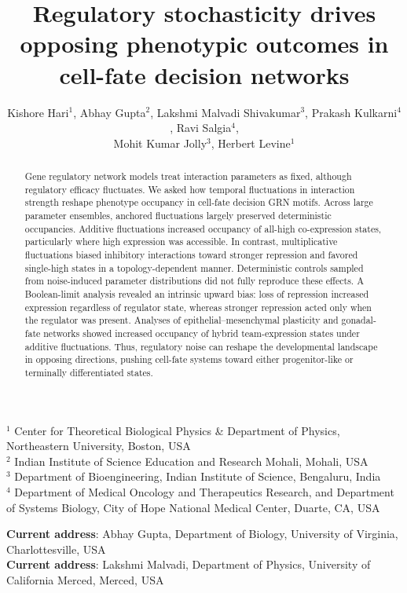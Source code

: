 \documentclass[11pt]{article}
\title{Regulatory stochasticity drives opposing phenotypic outcomes in cell-fate decision networks}
\author{Kishore Hari$^1$, Abhay Gupta$^2$, Lakshmi Malvadi Shivakumar$^3$, Prakash Kulkarni$^4$, Ravi Salgia$^4$, \\ Mohit Kumar Jolly$^3$, Herbert Levine$^1$}
\begin{document}
\maketitle
\begin{center}
    $^1$ Center for Theoretical Biological Physics \& Department of Physics, Northeastern University, Boston, USA\\
    $^2$ Indian Institute of Science Education and Research Mohali, Mohali, USA\\
    $^3$ Department of Bioengineering, Indian Institute of Science, Bengaluru, India \\
    $^4$ Department of Medical Oncology and Therapeutics Research, and Department of Systems Biology, City of Hope National Medical Center, Duarte, CA, USA \\
\end{center}

\begin{center}
    \textbf{Current address}: Abhay Gupta, Department of Biology, University of Virginia, Charlottesville, USA\\
\textbf{Current address}: Lakshmi Malvadi, Department of Physics, University of California Merced, Merced, USA
\end{center}
\begin{abstract}
Gene regulatory network models treat interaction parameters as fixed, although regulatory efficacy fluctuates. We asked how temporal fluctuations in interaction strength reshape phenotype occupancy in cell-fate decision GRN motifs. Across large parameter ensembles, anchored fluctuations largely preserved deterministic occupancies. Additive fluctuations increased occupancy of all-high co-expression states, particularly where high expression was accessible. In contrast, multiplicative fluctuations biased inhibitory interactions toward stronger repression and favored single-high states in a topology-dependent manner. Deterministic controls sampled from noise-induced parameter distributions did not fully reproduce these effects. A Boolean-limit analysis revealed an intrinsic upward bias: loss of repression increased expression regardless of regulator state, whereas stronger repression acted only when the regulator was present. Analyses of epithelial–mesenchymal plasticity and gonadal-fate networks showed increased occupancy of hybrid team-expression states under additive fluctuations. Thus, regulatory noise can reshape the developmental landscape in opposing directions, pushing cell-fate systems toward either progenitor-like or terminally differentiated states.


\end{abstract}
\end{document}
